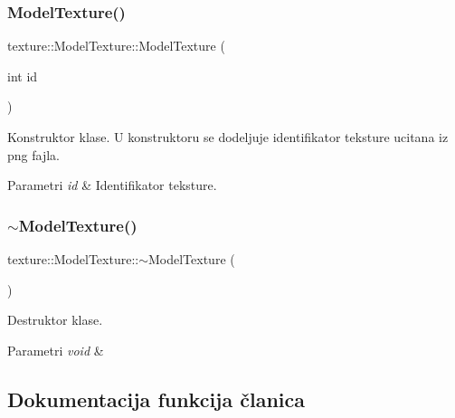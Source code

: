 \subsubsection{\texorpdfstring{Model\+Texture()}{ModelTexture()}}
{\footnotesize\ttfamily texture\+::\+Model\+Texture\+::\+Model\+Texture (\begin{DoxyParamCaption}\item[{int}]{id }\end{DoxyParamCaption})}



Konstruktor klase. U konstruktoru se dodeljuje identifikator teksture ucitana iz png fajla. 


\begin{DoxyParams}{Parametri}
{\em id} & Identifikator teksture. \\
\hline
\end{DoxyParams}
\mbox{\label{classtexture_1_1ModelTexture_ab0ce63043b8241b064a2c233ec24bfae}} 
\subsubsection{\texorpdfstring{$\sim$\+Model\+Texture()}{~ModelTexture()}}
{\footnotesize\ttfamily texture\+::\+Model\+Texture\+::$\sim$\+Model\+Texture (\begin{DoxyParamCaption}{ }\end{DoxyParamCaption})}



Destruktor klase. 


\begin{DoxyParams}{Parametri}
{\em void} & \\
\hline
\end{DoxyParams}


\subsection{Dokumentacija funkcija članica}
\mbox{\label{classtexture_1_1ModelTexture_adc0735b6b9c1df9f2c525f0663306cd3}} 
